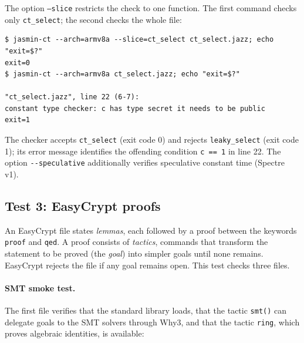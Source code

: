 \documentclass[11pt,a4paper]{article}
\newcommand{\cmd}[1]{\lstinline[style=shell,frame=none]{#1}}
\newcommand{\file}[1]{\texttt{#1}}
\begin{document}


The option \texttt{--slice} restricts the check to one function. The first
command checks only \texttt{ct\_select}; the second checks the whole file:

\begin{lstlisting}[style=shell]
$ jasmin-ct --arch=armv8a --slice=ct_select ct_select.jazz; echo "exit=$?"
exit=0
$ jasmin-ct --arch=armv8a ct_select.jazz; echo "exit=$?"

"ct_select.jazz", line 22 (6-7):
constant type checker: c has type secret it needs to be public
exit=1
\end{lstlisting}

The checker accepts \texttt{ct\_select} (exit code 0) and rejects
\texttt{leaky\_select} (exit code 1); its error message identifies the
offending condition \texttt{c == 1} in line 22. The option
\cmd{--speculative} additionally verifies speculative constant time
(Spectre v1).

\subsection{Test 3: EasyCrypt proofs}

An EasyCrypt file states \emph{lemmas}, each followed by a proof between the
keywords \texttt{proof} and \texttt{qed}. A proof consists of
\emph{tactics}, commands that transform the statement to be proved (the
\emph{goal}) into simpler goals until none remains. EasyCrypt rejects the
file if any goal remains open. This test checks three files.

\paragraph{SMT smoke test.} The first file verifies that the standard
library loads, that the tactic \texttt{smt()} can delegate goals to the SMT
solvers through Why3, and that the tactic \texttt{ring}, which proves
algebraic identities, is available:


\end{document}
